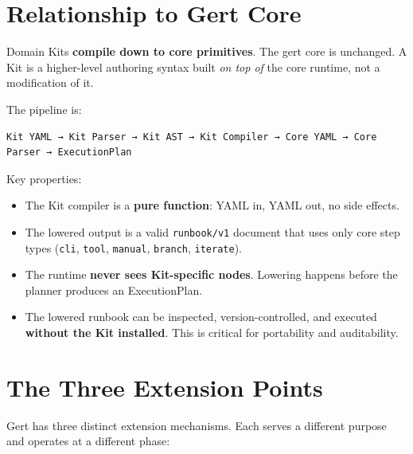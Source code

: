 \section{Relationship to Gert Core}
\label{sec:kit-and-core}

Domain Kits \textbf{compile down to core primitives}. The gert core is
unchanged. A Kit is a higher-level authoring syntax built \emph{on top of} the
core runtime, not a modification of it.

The pipeline is:

\begin{verbatim}
Kit YAML → Kit Parser → Kit AST → Kit Compiler → Core YAML → Core Parser → ExecutionPlan
\end{verbatim}

Key properties:

\begin{itemize}
  \item The Kit compiler is a \textbf{pure function}: YAML in, YAML out, no
    side effects.
  \item The lowered output is a valid \texttt{runbook/v1} document that uses
    only core step types (\texttt{cli}, \texttt{tool}, \texttt{manual},
    \texttt{branch}, \texttt{iterate}).
  \item The runtime \textbf{never sees Kit-specific nodes}. Lowering happens
    before the planner produces an ExecutionPlan.
  \item The lowered runbook can be inspected, version-controlled, and executed
    \textbf{without the Kit installed}. This is critical for portability and
    auditability.
\end{itemize}

\section{The Three Extension Points}
\label{sec:three-extension-points}

Gert has three distinct extension mechanisms. Each serves a different purpose
and operates at a different phase:

